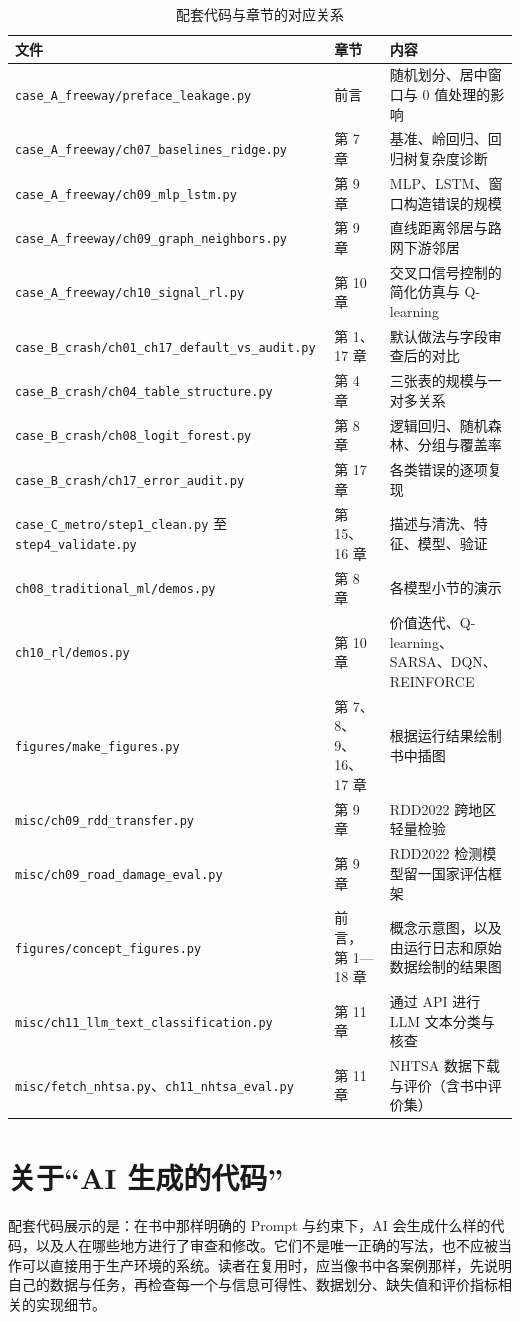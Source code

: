 \begin{table}[H]
\centering
\caption{配套代码与章节的对应关系}
\label{tab:app_code}
\small
\begin{tabular}{p{5.6cm}p{1.8cm}p{5.6cm}}
\toprule
文件 & 章节 & 内容 \\
\midrule
\texttt{case\_A\_freeway/preface\_leakage.py} & 前言 & 随机划分、居中窗口与 0 值处理的影响 \\
\texttt{case\_A\_freeway/ch07\_baselines\_ridge.py} & 第 7 章 & 基准、岭回归、回归树复杂度诊断 \\
\texttt{case\_A\_freeway/ch09\_mlp\_lstm.py} & 第 9 章 & MLP、LSTM、窗口构造错误的规模 \\
\texttt{case\_A\_freeway/ch09\_graph\_neighbors.py} & 第 9 章 & 直线距离邻居与路网下游邻居 \\
\texttt{case\_A\_freeway/ch10\_signal\_rl.py} & 第 10 章 & 交叉口信号控制的简化仿真与 Q-learning \\
\texttt{case\_B\_crash/ch01\_ch17\_default\_vs\_audit.py} & 第 1、17 章 & 默认做法与字段审查后的对比 \\
\texttt{case\_B\_crash/ch04\_table\_structure.py} & 第 4 章 & 三张表的规模与一对多关系 \\
\texttt{case\_B\_crash/ch08\_logit\_forest.py} & 第 8 章 & 逻辑回归、随机森林、分组与覆盖率 \\
\texttt{case\_B\_crash/ch17\_error\_audit.py} & 第 17 章 & 各类错误的逐项复现 \\
\texttt{case\_C\_metro/step1\_clean.py} 至 \texttt{step4\_validate.py} & 第 15、16 章 & 描述与清洗、特征、模型、验证 \\
\texttt{ch08\_traditional\_ml/demos.py} & 第 8 章 & 各模型小节的演示 \\
\texttt{ch10\_rl/demos.py} & 第 10 章 & 价值迭代、Q-learning、SARSA、DQN、REINFORCE \\
\texttt{figures/make\_figures.py} & 第 7、8、9、16、17 章 & 根据运行结果绘制书中插图 \\
\texttt{misc/ch09\_rdd\_transfer.py} & 第 9 章 & RDD2022 跨地区轻量检验 \\
\texttt{misc/ch09\_road\_damage\_eval.py} & 第 9 章 & RDD2022 检测模型留一国家评估框架 \\
\texttt{figures/concept\_figures.py} & 前言，第 1—18 章 & 概念示意图，以及由运行日志和原始数据绘制的结果图 \\
\texttt{misc/ch11\_llm\_text\_classification.py} & 第 11 章 & 通过 API 进行 LLM 文本分类与核查 \\
\texttt{misc/fetch\_nhtsa.py}、\texttt{ch11\_nhtsa\_eval.py} & 第 11 章 & NHTSA 数据下载与评价（含书中评价集） \\
\bottomrule
\end{tabular}
\end{table}

\section{关于“AI 生成的代码”}

配套代码展示的是：在书中那样明确的 Prompt 与约束下，AI 会生成什么样的代码，以及人在哪些地方进行了审查和修改。它们不是唯一正确的写法，也不应被当作可以直接用于生产环境的系统。读者在复用时，应当像书中各案例那样，先说明自己的数据与任务，再检查每一个与信息可得性、数据划分、缺失值和评价指标相关的实现细节。

